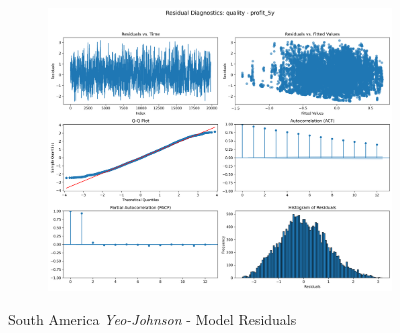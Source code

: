 \documentclass[11pt,english,a4paper,hidelinks]{book}
\begin{document}
\begin{figure}[H]
\begin{subfigure}[b]{0.32\textwidth}
    \end{subfigure}
    \hfill
    \begin{subfigure}[b]{0.32\textwidth}
    \centering
    \includegraphics[width=\textwidth]{images/code/models/linear_regression/first_model/LAT/quality_profit_5y_residuals - Gaussian.png}
    \end{subfigure}
    \caption{South America \textit{Yeo-Johnson} - Model Residuals}
    \label{fig:linear_regression_LAT_residues_gaussian}
\end{figure}
\end{document}
